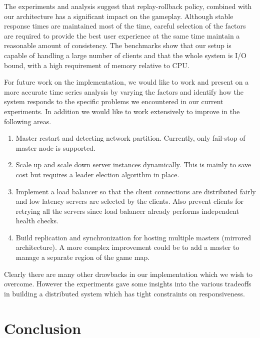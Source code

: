 \documentclass[a4paper]{IEEEtran}
\begin{document}
  \label{sec:discussion}
  
  The experiments and analysis suggest that replay-rollback policy, combined with our architecture has a significant impact on the gameplay. Although stable response times are maintained most of the time, careful selection of the factors are required to provide the best user experience at the same time maintain a reasonable amount of consistency. The benchmarks show that our setup is capable of handling a large number of clients and that the whole system is I/O bound, with a high requirement of memory relative to CPU.
  
  For future work on the implementation, we would like to work and present on a more accurate time series analysis by varying the factors and identify how the system responds to the specific problems we encountered in our current experiments. In addition we would like to work extensively to improve in the following areas.
  
  \begin{enumerate}
    \item Master restart and detecting network partition. Currently, only fail-stop of master node is supported.
    \item Scale up and scale down server instances dynamically. This is mainly to save cost but requires a leader election algorithm in place.
    \item Implement a load balancer so that the client connections are distributed fairly and low latency servers are selected by the clients. Also prevent clients for retrying all the servers since load balancer already performs independent health checks.
    \item Build replication and synchronization for hosting multiple masters (mirrored architecture). A more complex improvement could be to add a master to manage a separate region of the game map.
  \end{enumerate}
  
  Clearly there are many other drawbacks in our implementation which we wish to overcome. However the experiments gave some insights into the various tradeoffs in building a distributed system which has tight constraints on responsiveness.
  
  \section{Conclusion} \label{conclusion}
  
\end{document}
